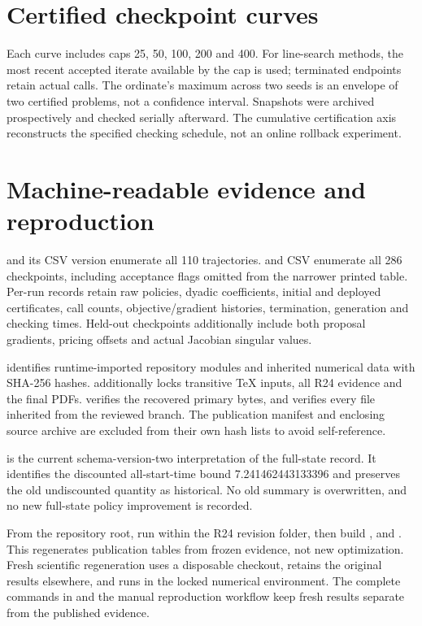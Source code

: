 \section{Certified checkpoint curves}
Each curve includes caps 25, 50, 100, 200 and 400. For line-search methods, the most recent accepted iterate available by the cap is used; terminated endpoints retain actual calls. The ordinate's maximum across two seeds is an envelope of two certified problems, not a confidence interval. Snapshots were archived prospectively and checked serially afterward. The cumulative certification axis reconstructs the specified checking schedule, not an online rollback experiment.

\clearpage


\section{Machine-readable evidence and reproduction}
 and its CSV version enumerate all 110 trajectories.  and CSV enumerate all 286 checkpoints, including acceptance flags omitted from the narrower printed table. Per-run records retain raw policies, dyadic coefficients, initial and deployed certificates, call counts, objective/gradient histories, termination, generation and checking times. Held-out checkpoints additionally include both proposal gradients, pricing offsets and actual Jacobian singular values.

 identifies runtime-imported repository modules and inherited numerical data with SHA-256 hashes.  additionally locks transitive TeX inputs, all R24 evidence and the final PDFs.  verifies the recovered primary bytes, and  verifies every file inherited from the reviewed branch. The publication manifest and enclosing source archive are excluded from their own hash lists to avoid self-reference.

 is the current schema-version-two interpretation of the full-state record. It identifies the discounted all-start-time bound 7.241462443133396 and preserves the old undiscounted quantity as historical. No old summary is overwritten, and no new full-state policy improvement is recorded.

From the repository root, run  within the R24 revision folder, then build ,  and . This regenerates publication tables from frozen evidence, not new optimization. Fresh scientific regeneration uses a disposable checkout, retains the original results elsewhere, and runs  in the locked numerical environment. The complete commands in  and the manual reproduction workflow keep fresh results separate from the published evidence.
